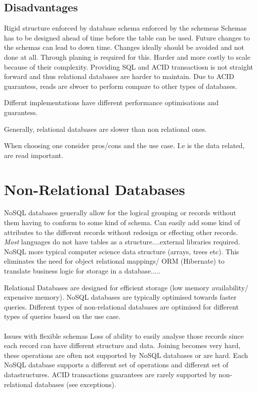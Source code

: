 \documentclass[a4paper, 11pt]{book}
\begin{document}
    \subsection{Disadvantages}
    Rigid structure enforced by database schema enforced by the schemeas
    Schemas has to be designed ahead of time before the table can be used.
    Future changes to the schemas can lead to down time.
    Changes ideally should be avoided and not done at all.
    Through planing is required for this.
    Harder and more costly to scale because of their complexity.
    Providing SQL and ACID transactiosn is not straight forward and thus relational databases are harder to maintain.
    Due to ACID guarantess, reads are slwoer to perform compare to other types of databases.

    Differnt implementations have different performance optimisations and guarantess.

    Generally, relational databases are slower than non relational ones.

    When choosing one consider pros/cons and the use case.
    I.e is the data related, are read important.


    \section{Non-Relational Databases}
    NoSQL databases generally allow for the logical grouping or records without them having to conform to some kind of schema.
    Can easily add some kind of attributes to the different records without redesign or effecting other records.
    \textit{Most} languages do not have tables as a structure....external libraries required.
    NoSQL more typical computer science data structure (arrays, trees etc).
    This eliminates the need for object relational mappings/ ORM (Hibernate) to translate business logic for storage in a database.....

    Relational Databases are designed for efficient storage (low memory availability/ expensive memory).
    NoSQL databases are typically optimised towards faster queries.
    Different types of non-relational databases are optimised for different types of queries based on the use case.

    \paragraph{}
    Issues with flexible schemas
    Loss of ability to easily analyse those records since each record can have different structure and data.
    Joining becomes very hard, these operations are often not supported by NoSQL databases or are hard.
    Each NoSQL database supports a different set of operations and different set of datastructures.
    ACID transactions guarantees are rarely supported by non-relational databases (see exceptions).
\end{document}
